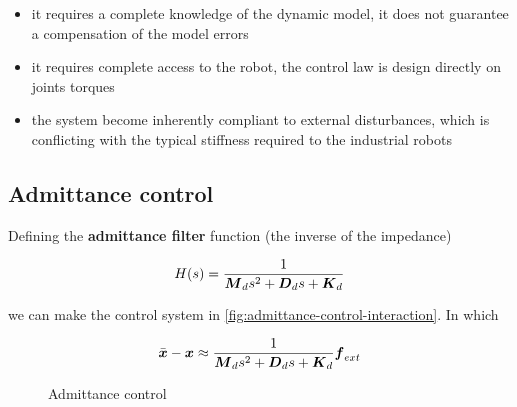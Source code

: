 \begin{itemize}
	\item it requires a complete knowledge of the dynamic model, it does not guarantee a compensation of the model errors
	\item it requires complete access to the robot, the control law is design directly on joints torques
	\item the system become inherently compliant to external disturbances, which is conflicting with the typical stiffness required to the industrial robots
\end{itemize}

\subsection{Admittance control}

Defining the \textbf{admittance filter} function (the inverse of the impedance)

\[
	H(s) = \frac{1}{\boldsymbol{M}_d s^2 + \boldsymbol{D}_d s + \boldsymbol{K}_d}
\]

we can make the control system in \autoref{fig:admittance-control-interaction}.
In which

\[
	\bar{\boldsymbol{x}} - \boldsymbol{x} \approx \frac{1}{\boldsymbol{M}_d s^2 + \boldsymbol{D}_d s + \boldsymbol{K}_d} \boldsymbol{f}_{ext}
\]

\begin{figure}[htb]
	\centering
	\caption{Admittance control}
	\label{fig:admittance-control-interaction}
\end{figure}
